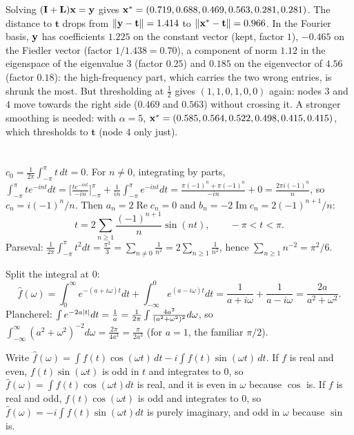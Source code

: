 Solving $(\mathbf{I} + \mathbf{L})\mathbf{x} = \mathbf{y}$ gives $\mathbf{x}^* = (0.719, 0.688, 0.469, 0.563, 0.281, 0.281)$. The distance to $\mathbf t$ drops from $\left\|\mathbf{y} - \mathbf t\right\| = 1.414$ to $\left\|\mathbf{x}^* - \mathbf t\right\| = 0.966$. In the
Fourier basis, $\mathbf{y}$ has coefficients $1.225$ on the constant vector (kept, factor $1$), $-0.465$ on the Fiedler vector
(factor $1/1.438 = 0.70$), a component of norm $1.12$ in the eigenspace of the eigenvalue $3$ (factor $0.25$) and $0.185$ on the
eigenvector of $4.56$ (factor $0.18$): the
high-frequency part, which carries the two wrong entries, is shrunk the most. But thresholding at $\frac12$ gives
$(1, 1, 0, 1, 0, 0)$ again: nodes $3$ and $4$ move towards the right side ($0.469$ and $0.563$) without crossing it. A stronger
smoothing is needed: with $\alpha = 5$, $\mathbf{x}^* = (0.585, 0.564, 0.522, 0.498, 0.415, 0.415)$, which thresholds to $\mathbf t$ (node $4$ only just).

\section{}

$c_0 = \frac1{2\pi}\int_{-\pi}^{\pi}t\,dt = 0$. For $n\ne0$, integrating by parts,
$\int_{-\pi}^{\pi} t e^{-int}dt = \bigl[\tfrac{t e^{-int}}{-in}\bigr]_{-\pi}^{\pi} + \tfrac1{in}\int_{-\pi}^{\pi}e^{-int}dt = \tfrac{\pi(-1)^n + \pi(-1)^n}{-in} + 0 = \tfrac{2\pi i(-1)^n}{n}$,
so $c_n = i(-1)^n/n$. Then $a_n = 2\operatorname{Re}c_n = 0$ and $b_n = -2\operatorname{Im}c_n = 2(-1)^{n+1}/n$:
\[
t = 2\sum_{n\ge1}\frac{(-1)^{n+1}}{n}\sin(nt), \qquad -\pi<t<\pi .
\]
Parseval: $\frac1{2\pi}\int_{-\pi}^{\pi}t^2dt = \frac{\pi^2}{3} = \sum_{n\ne0}\frac1{n^2} = 2\sum_{n\ge1}\frac1{n^2}$, hence $\sum_{n\ge1}n^{-2} = \pi^2/6$.

Split the integral at $0$:
\[
\hat f(\omega) = \int_0^\infty e^{-(a+i\omega)t}dt + \int_{-\infty}^0 e^{(a-i\omega)t}dt = \frac1{a+i\omega} + \frac1{a-i\omega} = \frac{2a}{a^2+\omega^2} .
\]
Plancherel: $\int e^{-2a\left|t\right|}dt = \frac1a = \frac1{2\pi}\int\frac{4a^2}{(a^2+\omega^2)^2}d\omega$, so
$\int_{-\infty}^\infty (a^2+\omega^2)^{-2}d\omega = \frac{2\pi}{4a^3} = \frac{\pi}{2a^3}$ (for $a=1$, the familiar $\pi/2$).

Write $\hat f(\omega) = \int f(t)\cos(\omega t)\,dt - i\int f(t)\sin(\omega t)\,dt$. If $f$ is real and even, $f(t)\sin(\omega t)$ is odd in $t$ and integrates to $0$, so $\hat f(\omega) = \int f(t)\cos(\omega t)dt$ is real, and it is even in $\omega$ because $\cos$ is. If $f$ is real and odd, $f(t)\cos(\omega t)$ is odd and integrates to $0$, so $\hat f(\omega) = -i\int f(t)\sin(\omega t)dt$ is purely imaginary, and odd in $\omega$ because $\sin$ is.

